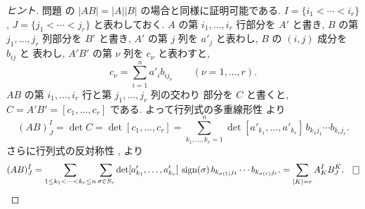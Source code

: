 \documentclass[12pt,twoside]{jarticle}
\begin{document}
\begin{proof}[ヒント]
  問題  の $|AB|=|A||B|$ の場合と同様に証明可能である.
  $I=\{i_1<\cdots<i_r\}$, $J=\{j_1<\cdots<j_r\}$ と表わしておく.
  $A$ の第 $i_1,\ldots,i_r$ 行部分を $A'$ と書き,
  $B$ の第 $j_1,\ldots,j_r$ 列部分を $B'$ と書き, 
  $A'$ の第 $j$ 列を $a'_j$ と表わし, $B$ の $(i,j)$ 成分を $b_{ij}$ と
  表わし, $A'B'$ の第 $\nu$ 列を $c_\nu$ と表わすと,
  \begin{equation*}
    c_\nu = \sum_{i=1}^n a'_i b_{i j_\nu} 
    \qquad (\nu=1,\ldots,r).
  \end{equation*}
  $AB$ の第 $i_1,\ldots,i_r$ 行と第 $j_1,\ldots,j_r$ 列の交わり
  部分を $C$ と書くと, $C=A'B'=[c_1,\ldots,c_r]$ である.
  よって行列式の多重線形性  より
  \begin{equation*}
    (AB)^I_J 
    = \det C
    = \det[c_1,\ldots,c_r]
    = \sum_{k_1,\ldots,k_r=1}^n 
    \det[a'_{k_1},\ldots,a'_{k_r}]
    \,b_{k_1 j_1}\cdots b_{k_r j_r}.
  \end{equation*}
  さらに行列式の反対称性 ,  より
  \begin{equation*}
    (AB)^I_J 
    = \sum_{1\le k_1<\cdots<k_r\le n}
    \sum_{\sigma\in S_r}
    \det[a'_{k_1},\ldots,a'_{k_r}]\,\sign(\sigma)
    \,b_{k_{\sigma(1)} j_1}\cdots b_{k_{\sigma(r)} j_r}.
    =\sum_{|K|=r} A^I_K B^K_J.
    \qed
  \end{equation*}
\end{proof}
\end{document}
